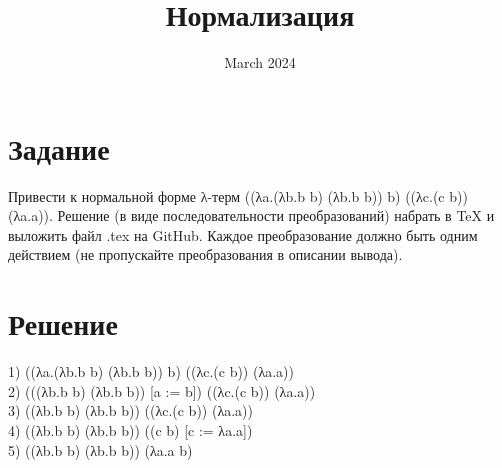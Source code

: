 \documentclass{article}
\title{Нормализация}
\date{March 2024}
\begin{document}
\maketitle

\section{Задание}
Привести к нормальной форме λ-терм ((λa.(λb.b b) (λb.b b)) b) ((λc.(c b)) (λa.a)). Решение (в виде последовательности преобразований) набрать в TeX и выложить файл .tex на GitHub. Каждое преобразование должно быть одним действием (не пропускайте преобразования в описании вывода).
\section{Решение}
1) ((λa.(λb.b b) (λb.b b)) b) ((λc.(c b)) (λa.a)) \\
2) (((λb.b b) (λb.b b)) [a := b]) ((λc.(c b)) (λa.a)) \\
3) ((λb.b b) (λb.b b)) ((λc.(c b)) (λa.a)) \\
4) ((λb.b b) (λb.b b)) ((c b) [c := λa.a]) \\
5) ((λb.b b) (λb.b b)) (λa.a b) \\
\end{document}
